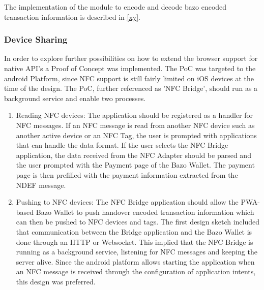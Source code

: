 \documentclass[a4paper]{article}
\begin{document}
The implementation of the module to encode and decode bazo encoded transaction information is described in \ref{xy}.

\subsubsection{Device Sharing}
In order to explore further possibilities on how to extend the browser support for native API's a Proof of Concept was implemented. The PoC was targeted to the android Platform, since NFC support is still fairly limited on iOS devices at the time of the design. The PoC, further referenced as 'NFC Bridge', should run as a background service and enable two processes.
\begin{enumerate}
\item Reading NFC devices:
The application should be registered as a handler for NFC messages. If an NFC message is read from another NFC device such as another active device or an NFC Tag, the user is prompted with applications that can handle the data format. If the user selects the NFC Bridge application, the data received from the NFC Adapter should be parsed and the user prompted with the Payment page of the Bazo Wallet. The payment page is then prefilled with the payment information extracted from the NDEF message.
\item Pushing to NFC devices: The NFC Bridge application should allow the PWA-based Bazo Wallet to push handover encoded transaction information which can then be pushed to NFC devices and tags.
The first design sketch included that communication between the Bridge application and the Bazo Wallet is done through an HTTP or Websocket. This implied that the NFC Bridge is running as a background service, listening for NFC messages and keeping the server alive.
Since the android platform allows starting the application when an NFC message is received through the configuration of application intents, this design was preferred.
\end{enumerate}
\end{document}
